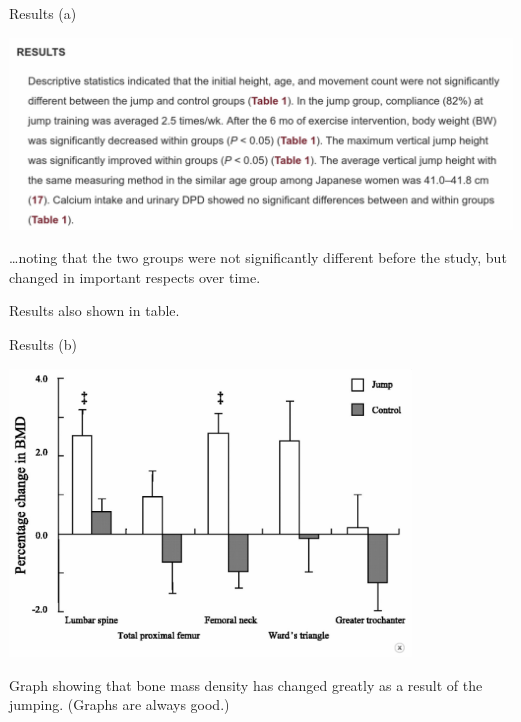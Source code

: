 \documentclass[unknownkeysallowed]{beamer}\usepackage[]{graphicx}\usepackage[]{color}
\begin{document}
\begin{frame}[fragile]{Results (a)}

  \includegraphics[width=\textwidth]{resultsa}  

  \ldots noting that the two groups were not significantly different
  before the study, but changed in important respects over time.
  
  Results also shown in table.
\end{frame}

\begin{frame}[fragile]{Results (b)}
  
  \includegraphics[width=0.8\textwidth]{resultsb}  

  Graph showing that bone mass density has changed greatly as a result
  of the jumping. (Graphs are always good.)
\end{frame}
\end{document}
